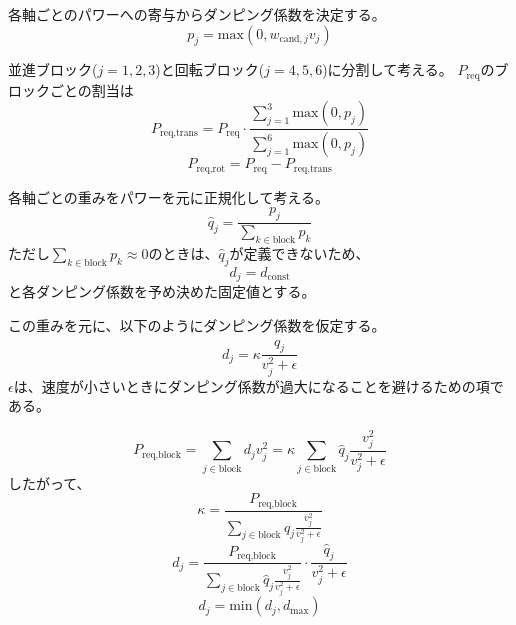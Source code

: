 \documentclass[uplatex]{jsarticle}
\begin{document}
各軸ごとのパワーへの寄与からダンピング係数を決定する。
\begin{equation}
  p_j = \text{max}(0, w_{\text{cand},j} v_j)
\end{equation}

並進ブロック($j=1,2,3$)と回転ブロック($j=4,5,6$)に分割して考える。
$P_{\text{req}}$のブロックごとの割当は
\begin{equation}
  P_{\text{req,trans}} = P_{\text{req}} \cdot \frac{\sum_{j=1}^{3} \text{max}(0,p_j)}{\sum_{j=1}^{6} \text{max}(0,p_j)}
\end{equation}
\begin{equation}
  P_{\text{req,rot}} = P_{\text{req}} - P_{\text{req,trans}}
\end{equation}

各軸ごとの重みをパワーを元に正規化して考える。
\begin{equation}
  \hat{q}_j = \frac{p_j}{\sum_{k \in \text{block}} p_k}
\end{equation}
ただし$\sum_{k \in \text{block}} p_k \approx 0$のときは、$\hat{q}_j$が定義できないため、
\begin{equation}
  d_j = d_{\text{const}}
\end{equation}
と各ダンピング係数を予め決めた固定値とする。

この重みを元に、以下のようにダンピング係数を仮定する。
\begin{equation}
  d_j = \kappa \frac{\hat{q}_j}{v_j^2 + \epsilon}
\end{equation}
$\epsilon$は、速度が小さいときにダンピング係数が過大になることを避けるための項である。

\begin{equation}
  P_{\text{req,block}} = \sum_{j \in \text{block}} d_j v_j^2 = \kappa \sum_{j \in \text{block}} \hat{q}_j \frac{v_j^2}{v_j^2+\epsilon}
\end{equation}
したがって、
\begin{equation}
  \kappa = \frac{P_{\text{req,block}}}{\sum_{j \in \text{block}} \hat{q}_j \frac{v_j^2}{v_j^2+\epsilon}}
\end{equation}
\begin{equation}
  d_j = \frac{P_{\text{req,block}}}{\sum_{j \in \text{block}} \hat{q}_j \frac{v_j^2}{v_j^2+\epsilon}} \cdot \frac{\hat{q}_j}{v_j^2 + \epsilon}
\end{equation}
\begin{equation}
  d_j = \text{min}(d_j, d_{\text{max}})
\end{equation}
\end{document}
